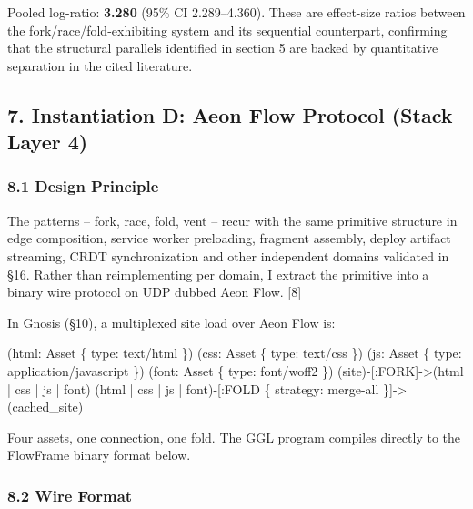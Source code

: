 \documentclass[
  11pt,
]{article}
\newenvironment{Shaded}{}{}
\newcommand{\NormalTok}[1]{#1}
\begin{document}
Pooled log-ratio: \textbf{3.280} (95\% CI 2.289--4.360). These are
effect-size ratios between the fork/race/fold-exhibiting system and its
sequential counterpart, confirming that the structural parallels
identified in section 5 are backed by quantitative separation in the
cited literature.

\subsection{7. Instantiation D: Aeon Flow Protocol (Stack Layer
4)}\label{instantiation-d-aeon-flow-protocol-stack-layer-4}

\subsubsection{8.1 Design Principle}\label{design-principle}

The patterns -- fork, race, fold, vent -- recur with the same primitive
structure in edge composition, service worker preloading, fragment
assembly, deploy artifact streaming, CRDT synchronization and other
independent domains validated in §16. Rather than reimplementing per
domain, I extract the primitive into a binary wire protocol on UDP
dubbed Aeon Flow. {[}8{]}

In Gnosis (§10), a multiplexed site load over Aeon Flow is:

\begin{Shaded}
\begin{Highlighting}[]
\NormalTok{(html: Asset \{ type: \textquotesingle{}text/html\textquotesingle{} \})}
\NormalTok{(css: Asset \{ type: \textquotesingle{}text/css\textquotesingle{} \})}
\NormalTok{(js: Asset \{ type: \textquotesingle{}application/javascript\textquotesingle{} \})}
\NormalTok{(font: Asset \{ type: \textquotesingle{}font/woff2\textquotesingle{} \})}
\NormalTok{(site){-}[:FORK]{-}\textgreater{}(html | css | js | font)}
\NormalTok{(html | css | js | font){-}[:FOLD \{ strategy: \textquotesingle{}merge{-}all\textquotesingle{} \}]{-}\textgreater{}(cached\_site)}
\end{Highlighting}
\end{Shaded}

Four assets, one connection, one fold. The GGL program compiles directly
to the FlowFrame binary format below.

\subsubsection{8.2 Wire Format}\label{wire-format}
\end{document}
